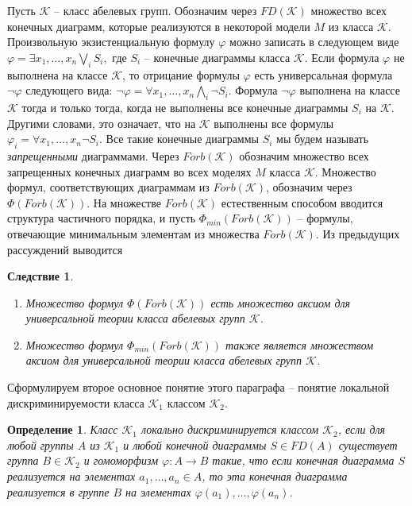 \documentclass[a4paper,11pt,twoside]{article}
\newtheorem{corollary}{Следствие}[section]
\newtheorem{definition}{Определение}[section]
\def\K{{\mathcal{K}}}
\begin{document}
Пусть $\K$ -- класс абелевых групп. Обозначим через $FD(\K)$ множество всех конечных диаграмм, которые реализуются в некоторой модели $M$ из класса $\K$. Произвольную экзистенциальную формулу $\varphi$ можно записать в следующем виде $\varphi = \exists x_1, \ldots, x_n \bigvee\limits_{i} S_i,$ где $S_i$ -- конечные диаграммы класса $\K$. Если формула $\varphi$ не выполнена на классе $\K$, то отрицание формулы $\varphi$ есть универсальная формула $\neg \varphi$ следующего вида: $\neg \varphi = \forall x_1, \ldots, x_n \bigwedge\limits_{i} \neg S_i$. Формула $\neg \varphi$ выполнена на классе $\K$ тогда и только тогда, когда не выполнены все конечные диаграммы $S_i$ на $\K$. Другими словами, это означает, что на $\K$ выполнены все формулы $\varphi_i = \forall x_1, \ldots, x_n \neg S_i$. Все такие конечные диаграммы $S_i$ мы будем называть \textit{запрещенными} диаграммами. Через $Forb(\K)$ обозначим множество всех запрещенных конечных диаграмм во всех моделях $M$ класса $\K$. Множество формул, соответствующих диаграммам из $Forb(\K)$, обозначим через $\Phi(Forb(\K))$. На множестве $Forb(\K)$ естественным способом вводится структура частичного порядка, и пусть $\Phi_{min}(Forb(\K))$ -- формулы, отвечающие минимальным элементам из множества $Forb(\K)$. Из предыдущих рассуждений выводится

\begin{corollary}\label{cor:ForbIsAxioms}
\begin{enumerate}
\item Множество формул $\Phi(Forb(\K))$ есть множество аксиом для универсальной теории класса абелевых групп $\K$.
\item Множество формул $\Phi_{min}(Forb(\K))$ также является множеством аксиом для универсальной теории класса абелевых групп $\K$.
\end{enumerate}
\end{corollary}


Сформулируем второе основное понятие этого параграфа -- понятие локальной дискриминируемости класса $\K_1$ классом $\K_2$.
\begin{definition}
Класс $\K_1$ локально дискриминируется классом $\K_2$, если для любой группы $A$ из $\K_1$ и любой конечной диаграммы $S \in FD(A)$ существует группа $B \in \K_2$ и гомоморфизм $\varphi: A \rightarrow B$ такие, что если конечная диаграмма $S$ реализуется на элементах $a_1, \ldots, a_n \in A$, то эта конечная диаграмма реализуется в группе $B$ на элементах $\varphi(a_1), \ldots, \varphi(a_n)$.
\end{definition}
\end{document}
